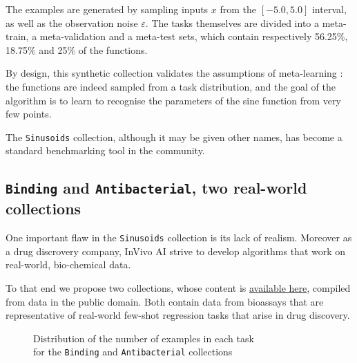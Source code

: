The examples are generated by sampling inputs $x$ from the $[-5.0, 5.0]$ interval, as well as the observation noise $\varepsilon$. The tasks themselves are divided into a meta-train, a meta-validation and a meta-test sets, which contain respectively 56.25\%, 18.75\% and 25\% of the functions.

By design, this synthetic collection validates the assumptions of meta-learning : the functions are indeed sampled from a task distribution, and the goal of the algorithm is to learn to recognise the parameters of the sine function from very few points.

The \texttt{Sinusoids} collection, although it may be given other names, has become a standard benchmarking tool in the community.



\subsection{\texttt{Binding} and \texttt{Antibacterial}, two real-world collections}
\label{app:collections-real}

One important flaw in the \texttt{Sinusoids} collection is its lack of realism. Moreover as a drug discrovery company, InVivo AI strive to develop algorithms that work on real-world, bio-chemical data.

To that end we propose two collections, whose content is \href{https://github.com/invivoai/molecular-datasets}{available here}, compiled from data in the public domain. Both contain data from bioassays that are representative of real-world few-shot regression tasks that arise in drug discovery.

\begin{figure}[ht]
  \caption{Distribution of the number of examples in each task\\for the \texttt{Binding} and \texttt{Antibacterial} collections}
  \label{fig:histograms}
\end{figure}

